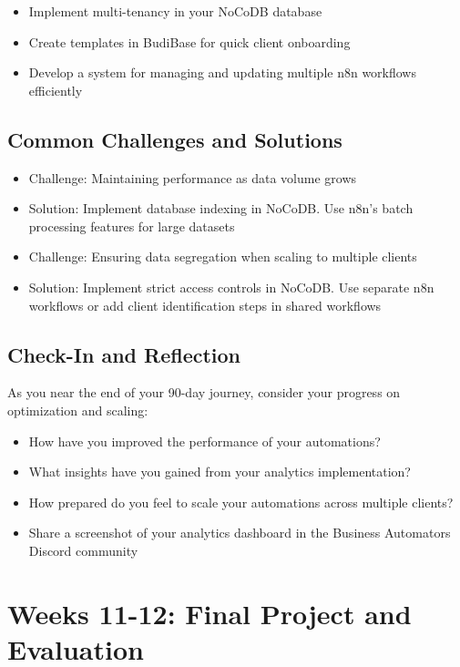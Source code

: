 \begin{itemize}
    \item Implement multi-tenancy in your NoCoDB database
    \item Create templates in BudiBase for quick client onboarding
    \item Develop a system for managing and updating multiple n8n workflows efficiently
\end{itemize}

\subsection{Common Challenges and Solutions}
\begin{itemize}
    \item Challenge: Maintaining performance as data volume grows
    \item Solution: Implement database indexing in NoCoDB. Use n8n's batch processing features for large datasets

    \item Challenge: Ensuring data segregation when scaling to multiple clients
    \item Solution: Implement strict access controls in NoCoDB. Use separate n8n workflows or add client identification steps in shared workflows
\end{itemize}

\subsection{Check-In and Reflection}
As you near the end of your 90-day journey, consider your progress on optimization and scaling:

\begin{itemize}
    \item How have you improved the performance of your automations?
    \item What insights have you gained from your analytics implementation?
    \item How prepared do you feel to scale your automations across multiple clients?
    \item Share a screenshot of your analytics dashboard in the Business Automators Discord community
\end{itemize}

\section{Weeks 11-12: Final Project and Evaluation}

